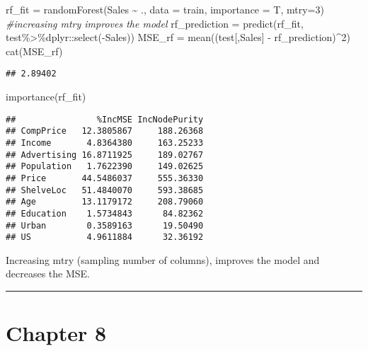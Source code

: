\documentclass[
]{article}
\newenvironment{Shaded}{\begin{snugshade}}{\end{snugshade}}
\newcommand{\AttributeTok}[1]{\textcolor[rgb]{0.77,0.63,0.00}{#1}}
\newcommand{\CommentTok}[1]{\textcolor[rgb]{0.56,0.35,0.01}{\textit{#1}}}
\newcommand{\DecValTok}[1]{\textcolor[rgb]{0.00,0.00,0.81}{#1}}
\newcommand{\FunctionTok}[1]{\textcolor[rgb]{0.00,0.00,0.00}{#1}}
\newcommand{\NormalTok}[1]{#1}
\newcommand{\OtherTok}[1]{\textcolor[rgb]{0.56,0.35,0.01}{#1}}
\newcommand{\SpecialCharTok}[1]{\textcolor[rgb]{0.00,0.00,0.00}{#1}}
\newcommand{\StringTok}[1]{\textcolor[rgb]{0.31,0.60,0.02}{#1}}
\begin{document}
\begin{Shaded}
\begin{Highlighting}[]
\NormalTok{rf\_fit }\OtherTok{=} \FunctionTok{randomForest}\NormalTok{(Sales }\SpecialCharTok{\textasciitilde{}}\NormalTok{ ., }\AttributeTok{data =}\NormalTok{ train, }\AttributeTok{importance =}\NormalTok{ T, }\AttributeTok{mtry=}\DecValTok{3}\NormalTok{) }\CommentTok{\#increasing mtry improves the model}
\NormalTok{rf\_prediction }\OtherTok{=} \FunctionTok{predict}\NormalTok{(rf\_fit, test}\SpecialCharTok{\%\textgreater{}\%}\NormalTok{dplyr}\SpecialCharTok{::}\FunctionTok{select}\NormalTok{(}\SpecialCharTok{{-}}\NormalTok{Sales))}
\NormalTok{MSE\_rf }\OtherTok{=} \FunctionTok{mean}\NormalTok{((test[,}\StringTok{\textquotesingle{}Sales\textquotesingle{}}\NormalTok{] }\SpecialCharTok{{-}}\NormalTok{ rf\_prediction)}\SpecialCharTok{\^{}}\DecValTok{2}\NormalTok{)}
\FunctionTok{cat}\NormalTok{(MSE\_rf)}
\end{Highlighting}
\end{Shaded}

\begin{verbatim}
## 2.89402
\end{verbatim}

\begin{Shaded}
\begin{Highlighting}[]
\FunctionTok{importance}\NormalTok{(rf\_fit)}
\end{Highlighting}
\end{Shaded}

\begin{verbatim}
##                %IncMSE IncNodePurity
## CompPrice   12.3805867     188.26368
## Income       4.8364380     163.25233
## Advertising 16.8711925     189.02767
## Population   1.7622390     149.02625
## Price       44.5486037     555.36330
## ShelveLoc   51.4840070     593.38685
## Age         13.1179172     208.79060
## Education    1.5734843      84.82362
## Urban        0.3589163      19.50490
## US           4.9611884      32.36192
\end{verbatim}

Increasing mtry (sampling number of columns), improves the model and
decreases the MSE.

\begin{center}\rule{0.5\linewidth}{0.5pt}\end{center}

\hypertarget{chapter-8-1}{%
\section{Chapter 8}\label{chapter-8-1}}
\end{document}
